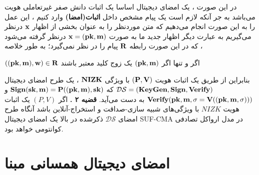 \documentclass[12pt,a4paper]{article}
\begin{document}
در این صورت ، یک امضای دیجیتال اساسا یک اثبات دانش صفر غیرتعاملی هویت می‌باشد به جر آنکه لازم است یک پیام مشخص داخل
{\bf{اثبات(امضا)}}
وارد کنیم ، این عمل را به این صورت انجام می‌دهیم که متن موردنظر را به عنوان بخشی از اظهار 
$\bf x$
درنظر می‌گیریم به عبارت دیگر اظهار جدید ما به صورت 
$\bf x = (pk,m)$
درنظر گرفته می‌شود که در این صورت رابطه 
$\bf R $
پیام را در نظر نمی‌گیرد؛ به طور خلاصه ،
\begin{center}
$\bf ((pk,m),w) \in R$
\quad
اگر و تنها اگر
\quad
$\bf (pk,m)$
یک زوج کلید معتبر باشند	
\end{center}	
بنابراین از طریق یک اثبات هویت 
$\bf (P,V)$
با ویژگی 
$\bf NIZK$
 ، یک طرح امضای دیجیتال 
 \newline
 $\bf \mathcal{DS} = (KeyGen,Sign,Verify)$
 که
 $\bf Sign(sk,m) = P((pk,m),sk)$
 و
 \newline
 $\bf Verify(pk,m,\sigma = V((pk,m,\sigma)))$
 به دست می‌آید.
\newpage 
\textbf{ قضیه ۲ .}
اگر 
$(P,V)$
یک اثبات هویت 
$NIZK$ 
با ویژگی‌های شبیه ‌سازی-صداقت و استخراج-آنلاین باشد آنگاه طرح امضای
$\mathcal{DS}$
ذکرشده در بالا یک امضای دیجیتال
SUF-CMA
در مدل ارواکل تصادفی کوانتومی خواهد بود.


\section{امضای دیجیتال همسانی مبنا}\label{isogeny_ds}
\end{document}
